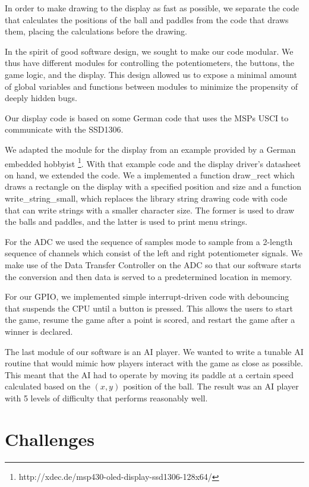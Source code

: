 \documentclass{article}
\begin{document}
In order to make drawing to the display as fast as possible, we separate the code that calculates the positions of the ball
and paddles from the code that draws them, placing the calculations before the drawing.

In the spirit of good software design, we sought to make our code modular. We thus have different modules for controlling the potentiometers, the buttons, the game logic, and the display. This design allowed us to expose a minimal amount of global variables and functions between modules to minimize the propensity of deeply hidden bugs. 

Our display code is based on some German code that uses the MSPs USCI to communicate with the SSD1306.

We adapted the module for the display from an example provided by a German embedded hobbyist \footnote{http://xdec.de/msp430-oled-display-ssd1306-128x64/}. With that example code and the display driver's datasheet on hand, we extended the code. We a implemented a function draw\_rect which draws a rectangle on the display with a specified position and size and
a function write\_string\_small, which replaces the library string drawing code with code that can write strings with a smaller
character size. The former is used to draw the balls and paddles, and the latter is used to print menu strings.

For the ADC we used the sequence of samples mode to sample from a 2-length sequence of channels which consist of the left and right potentiometer signals. We make use of the Data Transfer Controller on the ADC so that our software starts the conversion and then data is served to a predetermined location in memory. 

For our GPIO, we implemented simple interrupt-driven code with debouncing that suspends the CPU until a button is pressed. This allows the users to start the game, resume the game after a point is scored, and restart the game after a winner is declared.

The last module of our software is an AI player. We wanted to write a tunable AI routine that would mimic how players interact with the game as close as possible. This meant that the AI had to operate by moving its paddle at a certain speed calculated based on the $(x,y)$ position of the ball. The result was an AI player with 5 levels of difficulty that performs reasonably well.

\section{Challenges}
\end{document}
